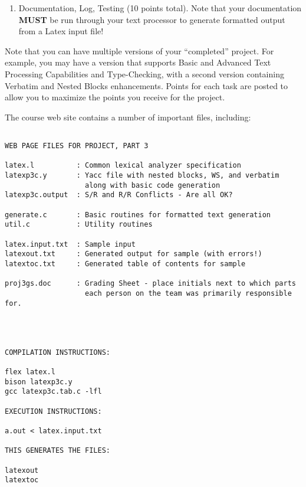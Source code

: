 \begin{enumerate}
\begin{itemize}
\begin{small}
\begin{verbatim}
                 One & Two & Three & Four \\
                 One & Two \\
                 \end{tabular}
            \end{verbatim}
            \end{small}
            has an error in the second entry since four columns are given.  
            Note that the third entry is allowed since there are less
            columns than specified, so Latex assumes a blank third 
            column for the entry.
      \end{itemize}
\item Documentation, Log, Testing (10 points total).  Note that your 
      documentation {\bf MUST} be run through your 
      text processor to generate formatted output from a Latex input file!
\end{enumerate}
\noindent
Note that you can have multiple versions of your ``completed'' project.
For example, you may have a version that supports Basic and Advanced Text 
Processing Capabilities and Type-Checking, with a second version containing
Verbatim and Nested Blocks enhancements.  Points for each task are posted
to allow you to maximize the points you receive for the project.

The course web site contains a number of important files, including:

\begin{small}
\begin{verbatim}

WEB PAGE FILES FOR PROJECT, PART 3

latex.l          : Common lexical analyzer specification
latexp3c.y       : Yacc file with nested blocks, WS, and verbatim
                   along with basic code generation
latexp3c.output  : S/R and R/R Conflicts - Are all OK?

generate.c       : Basic routines for formatted text generation
util.c           : Utility routines

latex.input.txt  : Sample input
latexout.txt     : Generated output for sample (with errors!)
latextoc.txt     : Generated table of contents for sample

proj3gs.doc      : Grading Sheet - place initials next to which parts
                   each person on the team was primarily responsible for.




COMPILATION INSTRUCTIONS:

flex latex.l
bison latexp3c.y
gcc latexp3c.tab.c -lfl

EXECUTION INSTRUCTIONS:

a.out < latex.input.txt

THIS GENERATES THE FILES:

latexout
latextoc
\end{verbatim}
\end{small}

